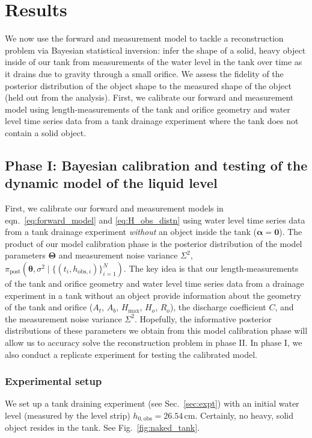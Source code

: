 \documentclass[openacc]{rsproca_new}%
\newcommand\thedatanomath {\{(t_i,h_{\text{obs}, i})\}_{i=1}^{N}}
\begin{document}
\section{Results}
We now use the forward and measurement model to tackle a reconstruction problem via Bayesian statistical inversion: infer the shape of a solid, heavy object inside of our tank from measurements of the water level in the tank over time as it drains due to gravity through a small orifice. We assess the fidelity of the posterior distribution of the object shape to the measured shape of the object (held out from the analysis). 
First, we calibrate our forward and measurement model using length-measurements of the tank and orifice geometry and water level time series data from a tank drainage experiment where the tank does not contain a solid object.

\subsection{Phase I: Bayesian calibration and testing of the dynamic model of the liquid level}
First, we calibrate our forward and measurement models in eqn.~\ref{eq:forward_model} and \ref{eq:H_obs_distn} using water level time series data from a tank drainage experiment \emph{without} an object inside the tank ($\boldsymbol \alpha = \mathbf{0}$).
The product of our model calibration phase is the posterior distribution of the model parameters $\boldsymbol \Theta$ and measurement noise variance $\Sigma^2$, $\pi_{\text{post}}(\boldsymbol \theta, \sigma^2 \mid \thedatanomath)$.
The key idea is that our length-measurements of the tank and orifice geometry and water level time series data from a drainage experiment in a tank without an object provide information about the geometry of the tank and orifice ($A_t$, $A_b$, $H_{\text{max}}$, $H_o$, $R_o$), the discharge coefficient $C$, and the measurement noise variance $\Sigma^2$. Hopefully, the informative posterior distributions of these parameters we obtain from this model calibration phase will allow us to accuracy solve the reconstruction problem in phase II. 
In phase I, we also conduct a replicate experiment for testing the calibrated model. 

\subsubsection{Experimental setup}
We set up a tank draining experiment (see Sec.~\ref{sec:expt}) with an initial water level (measured by the level strip) $h_{0, \text{obs}}=26.54$\,cm. 
Certainly, no heavy, solid object resides in the tank. 
See Fig.~\ref{fig:naked_tank}.
\end{document}

